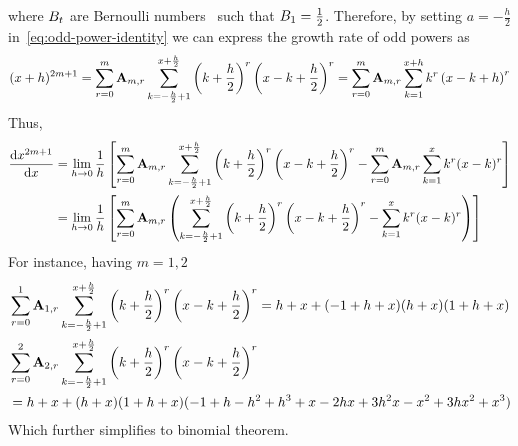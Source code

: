 where ${B}\sb{t}$ are Bernoulli numbers~\cite{bateman1953higher} such that ${B}\sb{1}=\frac{1}{2}$.
Therefore, by setting $a=-\frac{h}{2}$ in~\eqref{eq:odd-power-identity} we can express the growth rate of odd powers as
\begin{align*}
(x+h)
    ^{2m+1}
    = \sum_{r=0}^{m} {\mathbf{A}} \sb{m,r} \sum_{k=-\frac{h}{2}+1}^{x+\frac{h}{2}} \left( k+\frac{h}{2} \right)^{r} \left(x-k+\frac{h}{2} \right)^{r}
    = \sum_{r=0}^{m} {\mathbf{A}} \sb{m,r} \sum_{k=1}^{x+h} k^r \left(x-k+h \right)^{r}
\end{align*}
Thus,
\begin{align*}
    \odv{x^{2m+1}}{x}
    &= \lim_{h \to 0} \frac{1}{h} \left[ \sum_{r=0}^{m} \coeffA{m}{r} \sum_{k=-\frac{h}{2}+1}^{x+\frac{h}{2}} \left( k+\frac{h}{2} \right)^{r} \left(x-k+\frac{h}{2} \right)^{r}- \sum_{r=0}^{m} \coeffA{m}{r} \sum_{k=1}^{x} k^r (x-k)^r\right] \\
    &= \lim_{h \to 0} \frac{1}{h} \left[ \sum_{r=0}^{m} \coeffA{m}{r} \left( \sum_{k=-\frac{h}{2}+1}^{x+\frac{h}{2}} \left( k+\frac{h}{2} \right)^{r} \left(x-k+\frac{h}{2} \right)^{r}- \sum_{k=1}^{x} k^r (x-k)^r \right) \right]
\end{align*}
For instance, having $m=1,2$
\begin{align*}
    &\sum_{r=0}^{1} {\mathbf{A}} \sb{1,r} \sum_{k=-\frac{h}{2}+1}^{x+\frac{h}{2}} \left( k+\frac{h}{2} \right)^{r} \left(x-k+\frac{h}{2} \right)^{r}
    = h + x + (-1 + h + x) (h + x) (1 + h + x) \\
    &\sum_{r=0}^{2} {\mathbf{A}} \sb{2,r} \sum_{k=-\frac{h}{2}+1}^{x+\frac{h}{2}} \left( k+\frac{h}{2} \right)^{r} \left(x-k+\frac{h}{2} \right)^{r} \\
    &= h + x + (h + x) (1 + h + x) (-1 + h - h^2 + h^3 + x - 2 h x + 3 h^2 x - x^2 + 3 h x^2 + x^3)
\end{align*}
Which further simplifies to binomial theorem.
